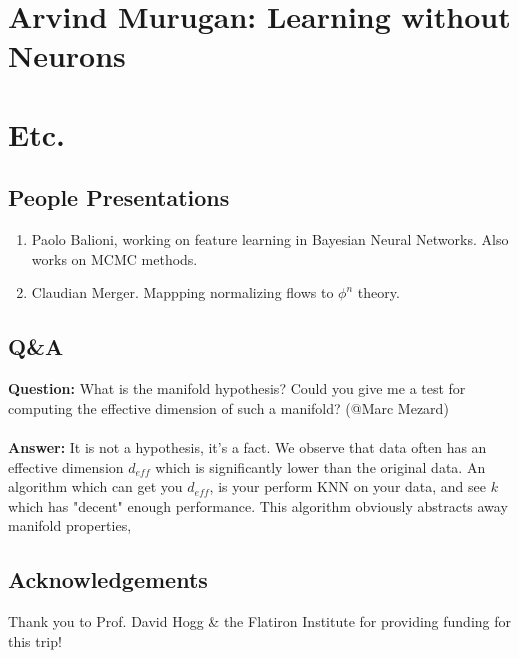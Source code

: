 \documentclass[12pt,fleqn]{book}
\numberwithin{equation}{section} %
\begin{document}
\chapter{Arvind Murugan: Learning without Neurons}

\newpage

\chapter{Etc.}

\section{People Presentations} 
\begin{enumerate}
	\item Paolo Balioni, working on feature learning in Bayesian Neural Networks. Also works on MCMC methods.
	\item Claudian Merger. Mappping normalizing flows to $\phi^n$ theory.
\end{enumerate}

\section{Q\&A}
\textbf{Question:} What is the manifold hypothesis? Could you give me a test for computing the effective dimension of such a manifold? (@Marc Mezard)
\\
\\
\textbf{Answer:} It is not a hypothesis, it's a fact. We observe that data often has an effective dimension $d_{eff}$ which is significantly lower than the original data. An algorithm which can get you $d_{eff}$, is your perform KNN on your data, and see $k$ which has "decent" enough performance. This algorithm obviously abstracts away manifold properties,

 
\section{Acknowledgements}
Thank you to Prof. David Hogg \& the Flatiron Institute for providing funding for this trip!
\end{document}
